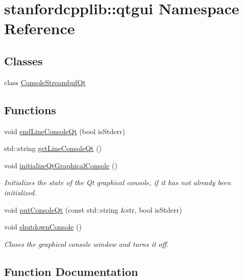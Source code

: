 \hypertarget{namespacestanfordcpplib_1_1qtgui}{}\section{stanfordcpplib\+:\+:qtgui Namespace Reference}
\label{namespacestanfordcpplib_1_1qtgui}
\subsection*{Classes}
\begin{DoxyCompactItemize}
\item 
class \mbox{\hyperlink{classstanfordcpplib_1_1qtgui_1_1ConsoleStreambufQt}{Console\+Streambuf\+Qt}}
\end{DoxyCompactItemize}
\subsection*{Functions}
\begin{DoxyCompactItemize}
\item 
void \mbox{\hyperlink{namespacestanfordcpplib_1_1qtgui_aa860978c1abc72823f943acd03b2cb26}{end\+Line\+Console\+Qt}} (bool is\+Stderr)
\item 
std\+::string \mbox{\hyperlink{namespacestanfordcpplib_1_1qtgui_ac9d3e41f643b89ff2ecbe0afc84072af}{get\+Line\+Console\+Qt}} ()
\item 
void \mbox{\hyperlink{namespacestanfordcpplib_1_1qtgui_a433d12106b00238f0ee11e8077ceafe1}{initialize\+Qt\+Graphical\+Console}} ()
\begin{DoxyCompactList}\small\item\em Initializes the state of the Qt graphical console, if it has not already been initialized. \end{DoxyCompactList}\item 
void \mbox{\hyperlink{namespacestanfordcpplib_1_1qtgui_a25ce060b47ba94ee61147714f19c1764}{put\+Console\+Qt}} (const std\+::string \&str, bool is\+Stderr)
\item 
void \mbox{\hyperlink{namespacestanfordcpplib_1_1qtgui_a2e21b562ecbfabf3b033ecf4cb370b50}{shutdown\+Console}} ()
\begin{DoxyCompactList}\small\item\em Closes the graphical console window and turns it off. \end{DoxyCompactList}\end{DoxyCompactItemize}


\subsection{Function Documentation}
\mbox{\label{namespacestanfordcpplib_1_1qtgui_aa860978c1abc72823f943acd03b2cb26}} 
